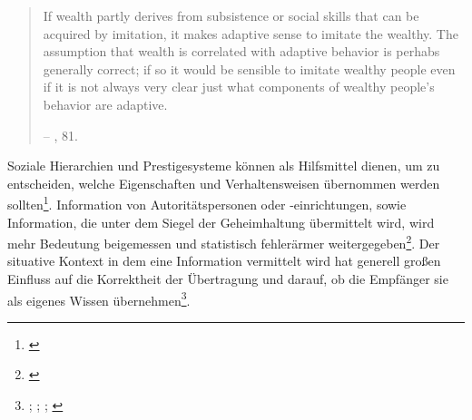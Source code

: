 \documentclass[openany,twoside,twocolumn]{book}
\let\rmarkdownfootnote\footnote%
\def\footnote{\protect\rmarkdownfootnote}
\begin{document}
\begin{quote}
If wealth partly derives from subsistence or social skills that can be acquired by imitation, it makes adaptive sense to imitate the wealthy. The assumption that wealth is correlated with adaptive behavior is perhabs generally correct; if so it would be sensible to imitate wealthy people even if it is not always very clear just what components of wealthy people's behavior are adaptive.

-- \textcite{smith_cultural_1992}, 81.
\end{quote}

Soziale Hierarchien und Prestigesysteme können als Hilfsmittel dienen, um zu entscheiden, welche Eigenschaften und Verhaltensweisen übernommen werden sollten\footnote{\textcite{rogers_diffusion_1983}}. Information von Autoritätspersonen oder -einrichtungen, sowie Information, die unter dem Siegel der Geheimhaltung übermittelt wird, wird mehr Bedeutung beigemessen und statistisch fehlerärmer weitergegeben\footnote{\textcite{rowlands_role_1993}}. Der situative Kontext in dem eine Information vermittelt wird hat generell großen Einfluss auf die Korrektheit der Übertragung und darauf, ob die Empfänger sie als eigenes Wissen übernehmen\footnote{\textcite{barth_cosmologies_1990}; \textcite{barth_guru_1990}; \textcite{labov_principles_1994}; \textcite{whitehouse_memorable_1992}}.
\end{document}
